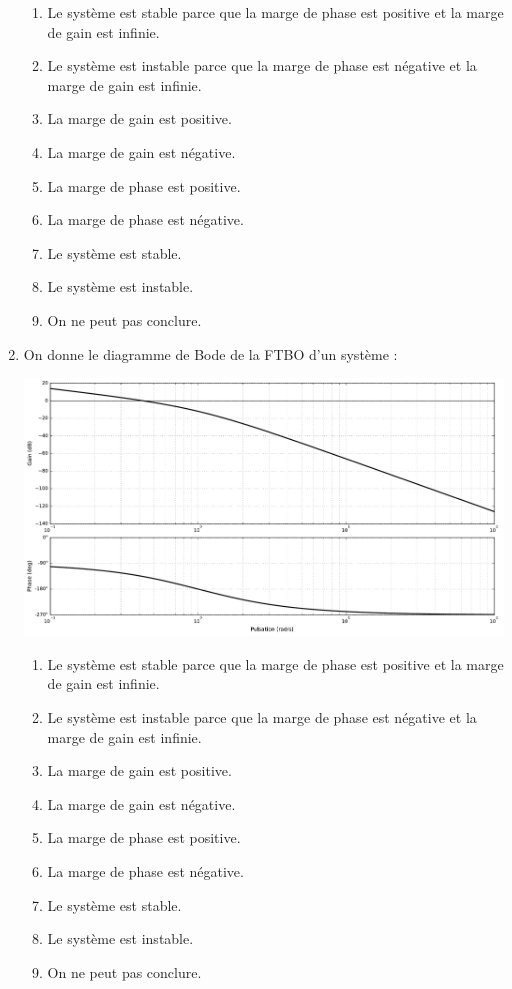 \documentclass[10pt,fleqn]{article} %
\begin{document}
\begin{multicols}{2}
\begin{enumerate}
\begin{center}
\end{center}
\begin{enumerate}
\item Le système est stable parce que la marge de phase est positive et la marge de gain est infinie.
\item Le système est instable parce que la marge de phase est négative et la marge de gain est infinie.
\item La marge de gain est positive.
\item La marge de gain est négative.
\item La marge de phase est positive.
\item La marge de phase est négative.
\item Le système est stable.
\item Le système est instable.
\item On ne peut pas conclure. %
\end{enumerate}

\item On donne le diagramme de Bode de la FTBO d'un système : 
\begin{center}
\includegraphics[width=\linewidth]{images/img_04}
\end{center}
\begin{enumerate}
\item Le système est stable parce que la marge de phase est positive et la marge de gain est infinie.
\item Le système est instable parce que la marge de phase est négative et la marge de gain est infinie.
\item La marge de gain est positive. %
\item La marge de gain est négative. %
\item La marge de phase est positive. %
\item La marge de phase est négative.
\item Le système est stable. %
\item Le système est instable.
\item On ne peut pas conclure. %
\end{enumerate}
\end{enumerate}

\fi

\end{multicols}
\end{document}
